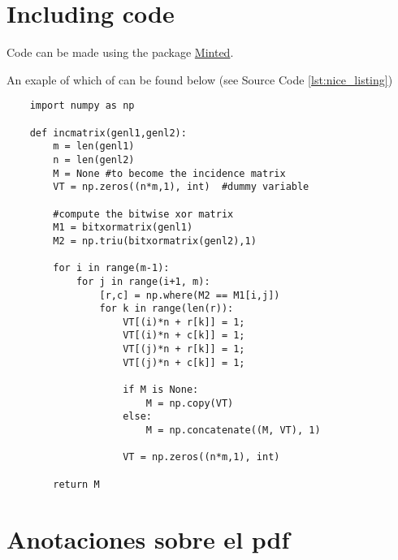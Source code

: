 \tinylipsum

\section*{Including code}

Code can be made using the package
\href{https://www.sharelatex.com/learn/Code\_Highlighting\_with\_minted}{Minted}.

An exaple of which of can be found below (see Source Code \ref{lst:nice_listing})

\begin{listing}[H]
	\begin{verbatim}
	import numpy as np

	def incmatrix(genl1,genl2):
	    m = len(genl1)
	    n = len(genl2)
	    M = None #to become the incidence matrix
	    VT = np.zeros((n*m,1), int)  #dummy variable

	    #compute the bitwise xor matrix
	    M1 = bitxormatrix(genl1)
	    M2 = np.triu(bitxormatrix(genl2),1)

	    for i in range(m-1):
	        for j in range(i+1, m):
	            [r,c] = np.where(M2 == M1[i,j])
	            for k in range(len(r)):
	                VT[(i)*n + r[k]] = 1;
	                VT[(i)*n + c[k]] = 1;
	                VT[(j)*n + r[k]] = 1;
	                VT[(j)*n + c[k]] = 1;

	                if M is None:
	                    M = np.copy(VT)
	                else:
	                    M = np.concatenate((M, VT), 1)

	                VT = np.zeros((n*m,1), int)

	    return M
	\end{verbatim}
  \label{lst:nice_listing}
\end{listing}

\section*{Anotaciones sobre el pdf}

\tinylipsum {} \tinylipsum {} \tinylipsum
